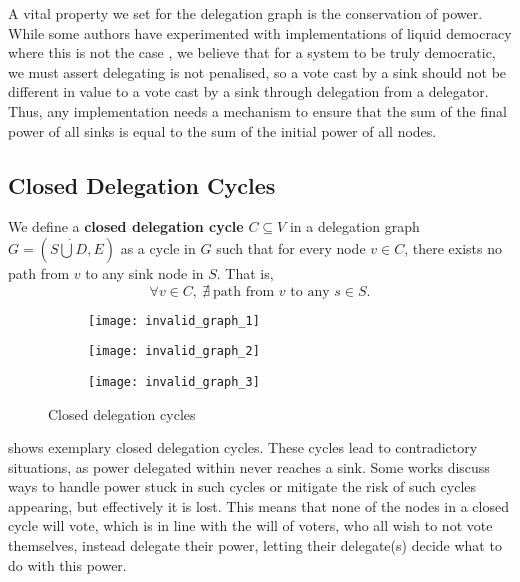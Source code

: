  A vital property we set for the delegation graph is the conservation of power. While some authors have experimented with implementations of liquid democracy where this is not the case \cite{bersetcheGeneralizingLiquidDemocracy2022, boldiViscousDemocracySocial2011}, we believe that for a system to be truly democratic, we must assert delegating is not penalised, so a vote cast by a sink should not be different in value to a vote cast by a sink through delegation from a delegator. Thus, any implementation needs a mechanism to ensure that the sum of the final power of all sinks is equal to the sum of the initial power of all nodes.

\subsection{Closed Delegation Cycles}

We define a \textbf{closed delegation cycle} $C \subseteq V$ in a delegation graph $G = (S \dot\bigcup D, E)$ as a cycle in $G$ such that for every node $v \in C$, there exists no path from $v$ to any sink node in $S$. That is,
\[
\forall v \in C,\ \nexists\ \text{path from } v \text{ to any } s \in S.
\]

\begin{figure}[t]
    \centering
    \begin{subfigure}[t]{0.32\textwidth}
        \centering
        \texttt{[image: invalid\_graph\_1]}
    \end{subfigure}
    \hfill
    \begin{subfigure}[t]{0.32\textwidth}
        \centering
        \texttt{[image: invalid\_graph\_2]}
    \end{subfigure}
    \hfill
    \begin{subfigure}[t]{0.32\textwidth}
        \centering
        \texttt{[image: invalid\_graph\_3]}
    \end{subfigure}
    \caption{Closed delegation cycles}
    \label{fig:closed-delegation-cycles}
\end{figure}

 shows exemplary closed delegation cycles. These cycles lead to contradictory situations, as power delegated within never reaches a sink. Some works discuss ways to handle power stuck in such cycles or mitigate the risk of such cycles appearing, but effectively it is lost. \cite{behrensCircularDelegationsMyth2015, brillInteractiveDemocracy2018} This means that none of the nodes in a closed cycle will vote, which is in line with the will of voters, who all wish to not vote themselves, instead delegate their power, letting their delegate(s) decide what to do with this power. 

